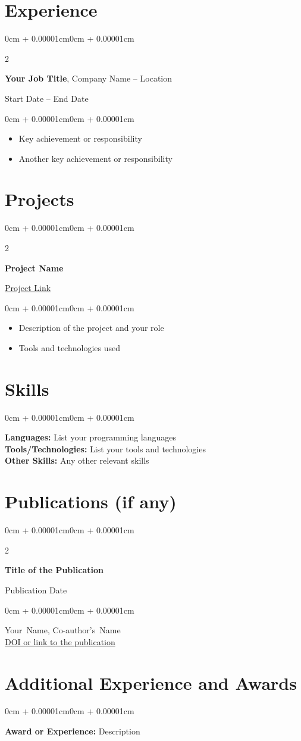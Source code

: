 \documentclass[10pt, letterpaper]{article}
\newenvironment{highlights}{
    \begin{itemize}[
        topsep=0.10cm,
        parsep=0.10cm,
        partopsep=0pt,
        itemsep=0pt,
        leftmargin=0cm + 10pt
    ]
}{
    \end{itemize}
}
\newenvironment{onecolentry}{
    \begin{adjustwidth}{0cm + 0.00001cm}{0cm + 0.00001cm}
}{
    \end{adjustwidth}
}
\newenvironment{twocolentry}[2][]{
    \onecolentry
    \def\secondColumn{#2}
    \setcolumnwidth{\fill, 4.5cm}
    \begin{paracol}{2}
}{
    \switchcolumn \raggedleft \secondColumn
    \end{paracol}
    \endonecolentry
}
\newcommand{\placelastupdatedtext}{%
  \AddToShipoutPictureFG*{%
    \put(
        \LenToUnit{\paperwidth-2cm-0cm+0.05cm},
        \LenToUnit{\paperheight-1.0cm}
    ){\vtop{{\null}\makebox[0pt][c]{\small\color{gray}\textit{Last updated in \today}}}}%
  }%
}
\begin{document}
\section{Experience}
\begin{twocolentry}{Start Date – End Date}
    \textbf{Your Job Title}, Company Name -- Location
\end{twocolentry}
\vspace{0.10cm}
\begin{onecolentry}
    \begin{highlights}
        \item Key achievement or responsibility
        \item Another key achievement or responsibility
    \end{highlights}
\end{onecolentry}

\section{Projects}
\begin{twocolentry}{\href{https://github.com/yourusername/yourproject}{Project Link}}
    \textbf{Project Name}
\end{twocolentry}
\vspace{0.10cm}
\begin{onecolentry}
    \begin{highlights}
        \item Description of the project and your role
        \item Tools and technologies used
    \end{highlights}
\end{onecolentry}

\section{Skills}
\begin{onecolentry}
    \textbf{Languages:} List your programming languages \\
    \textbf{Tools/Technologies:} List your tools and technologies \\
    \textbf{Other Skills:} Any other relevant skills
\end{onecolentry}

\section{Publications (if any)}
\begin{twocolentry}{Publication Date}
    \textbf{Title of the Publication}
\end{twocolentry}
\vspace{0.10cm}
\begin{onecolentry}
    \mbox{Your Name}, \mbox{Co-author's Name} \\
    \href{https://doi.org/yourdoi}{DOI or link to the publication}
\end{onecolentry}

\section{Additional Experience and Awards}
\begin{onecolentry}
    \textbf{Award or Experience:} Description
\end{onecolentry}

\placelastupdatedtext
\end{document}
